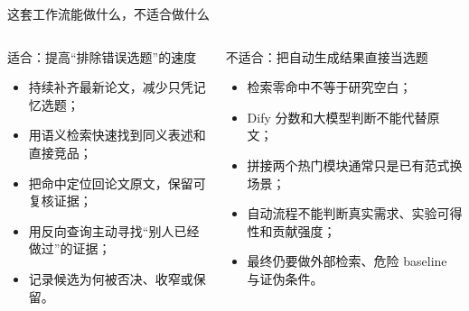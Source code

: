 \begin{frame}{这套工作流能做什么，不适合做什么}
  \footnotesize
  \vspace{-2em}
  \begin{columns}[T]
    \begin{exampleblock}{适合：提高“排除错误选题”的速度}
      \begin{itemize}\setlength{\itemsep}{2pt}
        \item 持续补齐最新论文，减少只凭记忆选题；
        \item 用语义检索快速找到同义表述和直接竞品；
        \item 把命中定位回论文原文，保留可复核证据；
        \item 用反向查询主动寻找“别人已经做过”的证据；
        \item 记录候选为何被否决、收窄或保留。
      \end{itemize}
    \end{exampleblock}

    \begin{alertblock}{不适合：把自动生成结果直接当选题}
      \begin{itemize}\setlength{\itemsep}{2pt}
        \item 检索零命中不等于研究空白；
        \item Dify 分数和大模型判断不能代替原文；
        \item 拼接两个热门模块通常只是已有范式换场景；
        \item 自动流程不能判断真实需求、实验可得性和贡献强度；
        \item 最终仍要做外部检索、危险 baseline 与证伪条件。
      \end{itemize}
    \end{alertblock}
  \end{columns}
\end{frame}

